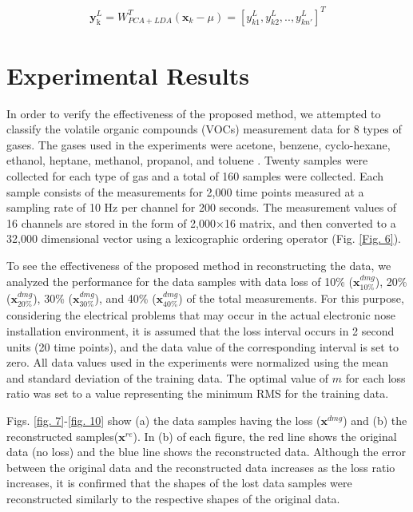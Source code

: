 \documentclass[10pt,letterpaper]{article}
\begin{document}
\begin{eqnarray}
\label{eq:sic16}
	\mathbf{y}_\mathrm{k}^L = W_{PCA+LDA}^T(\mathbf{x}_k-\mu)=[y_{k1}^{L},y_{k2}^{L},..,y_{kn'}^{L}]^T
\end{eqnarray}


\section*{Experimental Results}

In order to verify the effectiveness of the proposed method, we attempted to classify the volatile organic compounds (VOCs) measurement data for 8 types of gases. 
The gases used in the experiments were acetone, benzene, cyclo-hexane, ethanol, heptane, methanol, propanol, and toluene \cite{yang2005matched}. Twenty samples were collected for each type of gas and a total of 160 samples were collected. Each sample consists of the measurements for 2,000 time points measured at a sampling rate of 10 Hz per channel for 200 seconds. 
The measurement values of 16 channels are stored in the form of 2,000$\times$16 matrix, and then converted to a 32,000 dimensional vector using a lexicographic ordering operator \cite{choi2014discriminant} (Fig. \ref{Fig. 6}).

To see the effectiveness of the proposed method in reconstructing the data, we analyzed the performance for the data samples with data loss of 10\% ($\textbf{x}_{10\%}^{dmg}$), 20\% ($\textbf{x}_{20\%}^{dmg}$), 30\% ($\textbf{x}_{30\%}^{dmg}$), and 40\% ($\textbf{x}_{40\%}^{dmg}$) of the total measurements. 
For this purpose, considering the electrical problems that may occur in the actual electronic nose installation environment, it is assumed that the loss interval occurs in 2 second units (20 time points), and the data value of the corresponding interval is set to zero. 
All data values used in the experiments were normalized \cite{choi2014discriminant} using the mean and standard deviation of the training data. 
The optimal value of $m$ for each loss ratio was set to a value representing the minimum RMS for the training data.

Figs. \ref{fig. 7}-\ref{fig. 10} show (a) the data samples having the loss ($\textbf{x}^{dmg}$) and (b) the reconstructed samples($\textbf{x}^{re}$). 
In (b) of each figure, the red line shows the original data (no loss) and the blue line shows the reconstructed data. 
Although the error between the original data and the reconstructed data increases as the loss ratio increases, it is confirmed that the shapes of the lost data samples were reconstructed similarly to the respective shapes of the original data. 
\end{document}
